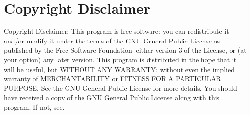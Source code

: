 \section*{Copyright Disclaimer}
  \begin{frame}
    \begin{justify}
      {\justifying Copyright \alert{Disclaimer}: This program is free software: you can redistribute it and/or modify it under the terms of the GNU General Public License as published by the Free Software Foundation, either version 3 of the License, or (at your option) any later version.
      \bigbreak
      This program is distributed in the hope that it will be useful, but WITHOUT ANY WARRANTY; without even the implied warranty of MERCHANTABILITY or FITNESS FOR A PARTICULAR PURPOSE.  See the GNU General Public License for more details.
      \bigbreak
      You should have received a copy of the GNU General Public License along with this program.  If not, see.~\cite{gnuLicences} }
    \end{justify}
\end{frame}
